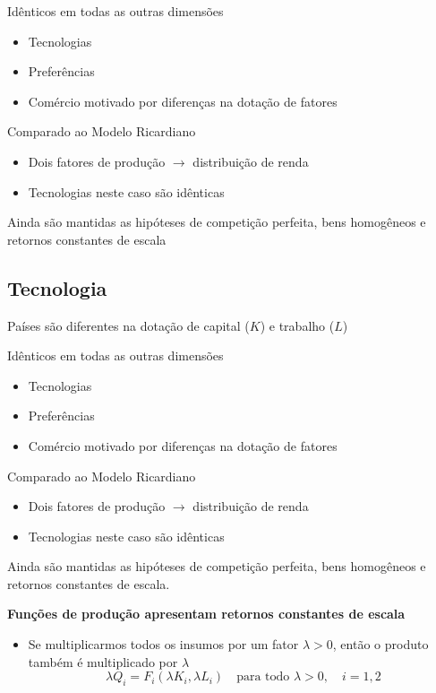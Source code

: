 \documentclass[a4paper,12pt]{article}[abntex2]
\begin{document}
Idênticos em todas as outras dimensões\begin{itemize}
    \item Tecnologias
    \item Preferências
    \item Comércio motivado por diferenças na dotação de fatores
\end{itemize}

Comparado ao Modelo Ricardiano\begin{itemize}
    \item Dois fatores de produção \(\rightarrow\) distribuição de renda
    \item Tecnologias neste caso são idênticas
\end{itemize}

Ainda são mantidas as hipóteses de competição perfeita, bens homogêneos e retornos constantes de escala

\subsection{\textbf{Tecnologia}}
Países são diferentes na dotação de capital (\(K\)) e trabalho (\(L\))

Idênticos em todas as outras dimensões
\begin{itemize}
    \item Tecnologias
    \item Preferências
    \item Comércio motivado por diferenças na dotação de fatores
\end{itemize}

Comparado ao Modelo Ricardiano
\begin{itemize}
    \item Dois fatores de produção \(\rightarrow\) distribuição de renda
    \item Tecnologias neste caso são idênticas
\end{itemize}

Ainda são mantidas as hipóteses de competição perfeita, bens homogêneos e retornos constantes de escala.

\textbf{Funções de produção apresentam retornos constantes de escala}

\begin{itemize}
    \item Se multiplicarmos todos os insumos por um fator \(\lambda > 0\), então o produto também é multiplicado por \(\lambda\)
    \[
    \lambda Q_i = F_i(\lambda K_i, \lambda L_i) \quad \text{para todo } \lambda > 0, \quad i = 1,2
    \]
\end{itemize}
\end{document}
